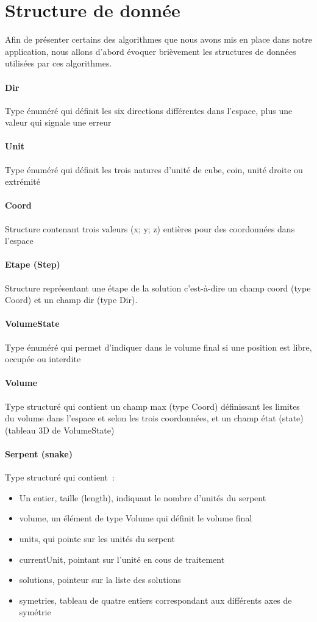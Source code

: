 \section{Structure de donnée}
Afin de présenter certains des algorithmes que nous avons mis en place dans notre application, nous allons d'abord évoquer brièvement les structures de données utilisées par ces algorithmes.

\paragraph{Dir} Type énuméré qui définit les six directions différentes dans l’espace, plus une valeur qui signale une erreur
\paragraph{Unit} Type énuméré qui définit les trois natures d’unité de cube, coin, unité droite ou extrémité
\paragraph{Coord} Structure contenant trois valeurs (x; y; z) entières pour des coordonnées dans l’espace
\paragraph{Etape (Step)} Structure représentant une étape de la solution c’est-à-dire un champ coord (type Coord) et un champ dir (type Dir).
\paragraph{VolumeState} Type énuméré qui permet d’indiquer dans le volume final si une position est libre, occupée ou interdite
\paragraph{Volume} Type structuré qui contient un champ max (type Coord) définissant les limites du volume dans l’espace et selon les trois coordonnées, et un champ état (state) (tableau 3D de VolumeState)
\paragraph{Serpent (snake)} Type structuré qui contient : 
\begin{itemize}
 \item Un entier, taille (length), indiquant le nombre d’unités du serpent 
 \item volume, un élément de type Volume qui définit le volume final
 \item units, qui pointe sur les unités du serpent 
 \item currentUnit, pointant sur l’unité en cous de traitement 
 \item solutions, pointeur sur la liste des solutions 
 \item symetries, tableau de quatre entiers correspondant aux différents axes de symétrie
\end{itemize}
